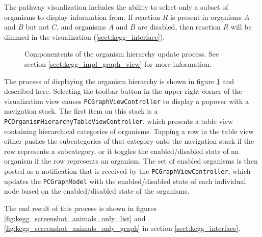 The \keggapp pathway visualization includes the ability to select only a subset
of organisms to display information from. If reaction $R$ is present in
organisms $A$ and $B$ but not $C$, and organisms $A$ and $B$ are disabled, then
reaction $R$ will be dimmed in the visualization (\ref{sect:kegg_interface}).

\begin{figure}[hbtp]
    \caption{\label{fig:kegg_org_hierarchy_ui} Componentents of the organism
    hierarchy update process. See section \ref{sect:kegg_impl_graph_view} for
    more information.}
\end{figure}

The process of displaying the organism hierarchy is shown in figure
\ref{fig:kegg_org_hierarchy_ui} and described here. Selecting the toolbar
button in the upper right corner of the visualization view causes
\texttt{PCGraphViewController} to display a popover with a navigation stack. The
first item on this stack is a \texttt{PCOrganismHierarchyTableViewController},
which presents a table view containing hierarchical categories of organisms.
Tapping a row in the table view either pushes the subcategories of that category
onto the navigation stack if the row represents a subcategory, or it toggles the
enabled/disabled state of an organism if the row represents an organism. The set
of enabled organisms is then posted as a notification that is received by the
\texttt{PCGraphViewController}, which updates the \texttt{PCGraphModel} with the
enabled/disabled state of each individual node based on the enabled/disabled
state of the organisms.

The end result of this process is shown in figures
\ref{fig:kegg_screenshot_animals_only_list} and
\ref{fig:kegg_screenshot_animals_only_graph} in section
\ref{sect:kegg_interface}.

